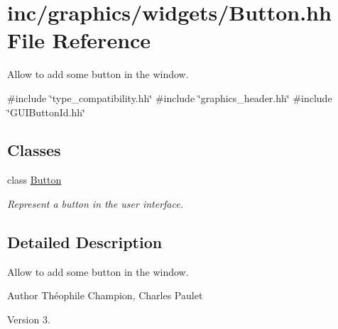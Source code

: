 \hypertarget{Button_8hh}{}\section{inc/graphics/widgets/\+Button.hh File Reference}
\label{Button_8hh}


Allow to add some button in the window.  


{\ttfamily \#include \char`\"{}type\+\_\+compatibility.\+hh\char`\"{}}\newline
{\ttfamily \#include \char`\"{}graphics\+\_\+header.\+hh\char`\"{}}\newline
{\ttfamily \#include \char`\"{}G\+U\+I\+Button\+Id.\+hh\char`\"{}}\newline
\subsection*{Classes}
\begin{DoxyCompactItemize}
\item 
class \hyperlink{classButton}{Button}
\begin{DoxyCompactList}\small\item\em Represent a button in the user interface. \end{DoxyCompactList}\end{DoxyCompactItemize}


\subsection{Detailed Description}
Allow to add some button in the window. 

\begin{DoxyAuthor}{Author}
Théophile Champion, Charles Paulet 
\end{DoxyAuthor}
\begin{DoxyVersion}{Version}
3. 
\end{DoxyVersion}
